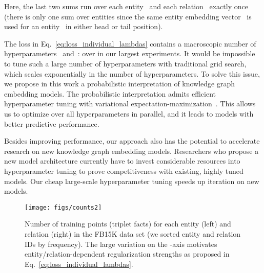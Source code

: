 \documentclass[letterpage]{article}
\begin{document}
Here, the last two sums run over each entity~ and each relation~ exactly once (there is only one sum over entities since the same entity embedding vector~ is used for an entity~ in either head or tail position).

The loss in Eq.~\ref{eq:loss_individual_lambdas} contains a macroscopic number of hyperparameters ~and~:
over  in our largest experiments.
It would be impossible to tune such a large number of hyperparameters with traditional grid search, which scales exponentially in the number of hyperparameters.
To solve this issue, we propose in this work a probabilistic interpretation of knowledge graph embedding models.
The probabilistic interpretation admits efficient hyperparameter tuning with variational expectation-maximization~\citep{dempster1977maximum,bernardo2003variational}.
This allows us to optimize over all hyperparameters in parallel, and it leads to models with better predictive performance.

Besides improving performance, our approach also has the potential to accelerate research on new knowledge graph embedding models.
Researchers who propose a new model architecture currently have to invest considerable resources into hyperparameter tuning to prove competitiveness with existing, highly tuned models.
Our cheap large-scale hyperparameter tuning speeds up iteration on new models.

\begin{figure}
  \centering
  \texttt{[image: figs/counts2]}
  \caption{
    Number of training points (triplet facts) for each entity (left) and relation (right) in the FB15K data set (we sorted entity and relation IDs by frequency).
    The large variation on the -axis motivates entity/relation-dependent regularization strengths as proposed in Eq.~\ref{eq:loss_individual_lambdas}.
  }\label{fig:counts}
\end{figure}
\end{document}
